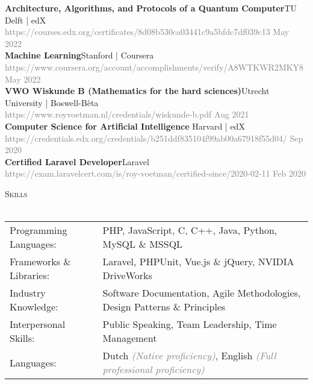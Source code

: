 \documentclass[a4paper]{article}
\newcommand{\lineunder} {
    \vspace*{-8pt} \\
    \hspace*{-18pt} \hrulefill \\
}
\newcommand{\header} [1] {
    {\hspace*{-18pt}\vspace*{6pt} \textsc{#1}}
    \vspace*{-6pt} \lineunder
}
\begin{document}
\textbf{Architecture, Algorithms, and Protocols of a Quantum Computer}\hfill TU Delft | edX\\
 \textcolor{gray}{https://courses.edx.org/certificates/8d08b530ca03441c9a5bfdc7df039c13} \hfill \textcolor{gray}{May 2022}\\
 \vspace{2mm}
 \textbf{Machine Learning}\hfill Stanford | Coursera\\
 \textcolor{gray}{https://www.coursera.org/account/accomplishments/verify/A8WTKWR2MKY8} \hfill \textcolor{gray}{May 2022}\\
 \vspace{2mm}
 \textbf{VWO Wiskunde B (Mathematics for the hard sciences)}\hfill Utrecht University | Boswell-Bèta\\
 \textcolor{gray}{https://www.royvoetman.nl/credentials/wiskunde-b.pdf}
 \hfill \textcolor{gray}{Aug 2021}\\
\vspace{2mm}
\textbf{Computer Science for Artificial Intelligence }\hfill Harvard | edX\\
\textcolor{gray}{https://credentials.edx.org/credentials/b251ddf835104f99ab00a67918f55d04/} \hfill \textcolor{gray}{Sep 2020}\\
\vspace{2mm}
\textbf{Certified Laravel Developer}\hfill Laravel\\
\textcolor{gray}{https://exam.laravelcert.com/is/roy-voetman/certified-since/2020-02-11} \hfill \textcolor{gray}{Feb 2020}\\
\vspace{2mm}

\vspace{5mm}

\header{Skills}
\vspace{2mm}
\begin{tabular}{l l}

	Programming Languages:   & PHP, JavaScript, C, C++, Java, Python, MySQL \& MSSQL
	\vspace{1mm}\\
	
    Frameworks \& Libraries: & Laravel, PHPUnit, Vue.js \& jQuery, NVIDIA DriveWorks
    \vspace{1mm}\\
    
	Industry Knowledge:      & Software Documentation, Agile Methodologies, Design Patterns \& Principles
	\vspace{1mm}\\
	
	Interpersonal Skills:    & Public Speaking, Team Leadership, Time Management
	\vspace{1mm}\\
	
    Languages:               & Dutch \textcolor{gray}{\emph{(Native proficiency)}}, English \textcolor{gray}{\emph{(Full professional proficiency)}}\\
    
\end{tabular}
\vspace{2mm}
\end{document}
